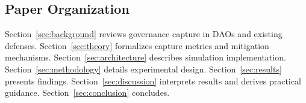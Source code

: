 \subsection{Paper Organization}

Section~\ref{sec:background} reviews governance capture in DAOs and existing defenses. Section~\ref{sec:theory} formalizes capture metrics and mitigation mechanisms. Section~\ref{sec:architecture} describes simulation implementation. Section~\ref{sec:methodology} details experimental design. Section~\ref{sec:results} presents findings. Section~\ref{sec:discussion} interprets results and derives practical guidance. Section~\ref{sec:conclusion} concludes.
